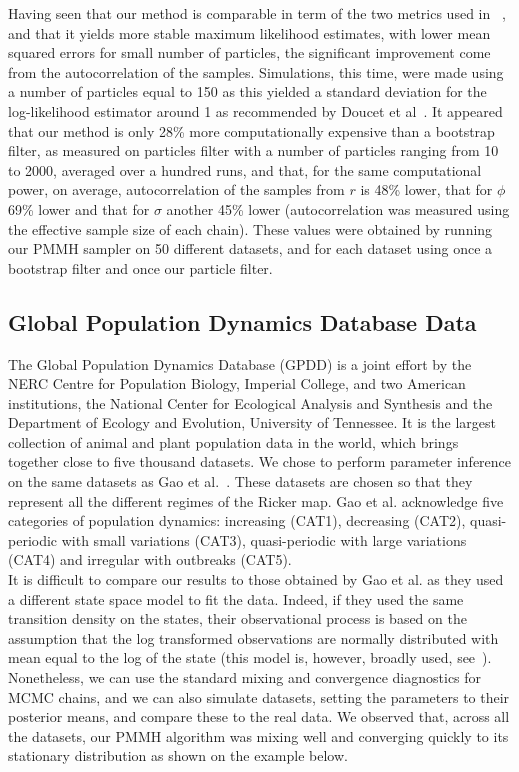 \documentclass[12pt]{article}
\begin{document}
\clearpage
	Having seen that our method is comparable in term of the two metrics used in ~\cite{fasiolo2014statistical}, and that it yields more stable maximum likelihood estimates, with lower mean squared errors for small number of particles, the significant improvement come from the autocorrelation of the samples. Simulations, this time, were made using a number of particles equal to 150 as this yielded a standard deviation for the log-likelihood estimator around 1 as recommended by Doucet et al~\cite{doucet2015efficient}. It appeared that our method is only 28\% more computationally expensive than a bootstrap filter, as measured on particles filter with a number of particles ranging from 10 to 2000, averaged over a hundred runs, and that, for the same computational power, on average, autocorrelation of the samples from $r$ is 48\% lower, that for $\phi$ 69\% lower and that for $\sigma$ another 45\% lower (autocorrelation was measured using the effective sample size of each chain). These values were obtained by running our PMMH sampler on 50 different datasets, and for each dataset using once a bootstrap filter and once our particle filter.
	
	\subsection{Global Population Dynamics Database Data} \label{GPDD}
	The Global Population Dynamics Database (GPDD) is a joint effort by the NERC Centre for Population Biology, Imperial College, and two American institutions, the National Center for Ecological Analysis and Synthesis and the Department of Ecology and Evolution, University of Tennessee. It is the largest collection of animal and plant population data in the world, which brings together close to five thousand datasets. We chose to perform parameter inference on the same datasets as Gao et al.~\cite{gao2012bayesian}. These datasets are chosen so that they represent all the different regimes of the Ricker map. Gao et al. acknowledge five categories of population dynamics: increasing (CAT1), decreasing (CAT2), quasi-periodic with small variations (CAT3), quasi-periodic with large variations (CAT4) and irregular with outbreaks (CAT5). \\
	It is difficult to compare our results to those obtained by Gao et al. as they used a different state space model to fit the data. Indeed, if they used the same transition density on the states, their observational process is based on the assumption that the log transformed observations are normally distributed with mean equal to the log of the state (this model is, however, broadly used, see~\cite{de2002fitting, valpine2005state, peters2010ecological}). Nonetheless, we can use the standard mixing and convergence diagnostics for MCMC chains, and  we can also simulate datasets, setting the parameters to their posterior means, and compare these to the real data. We observed that, across all the datasets, our PMMH algorithm was mixing well and converging quickly to its stationary distribution as shown on the example below.
	
\end{document}

